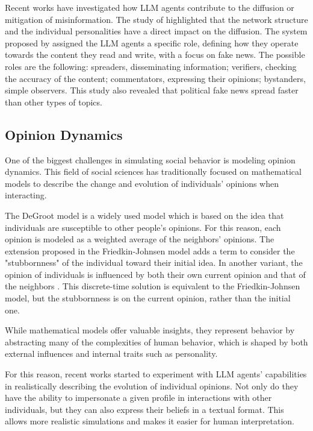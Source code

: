 Recent works have investigated how LLM agents contribute to the diffusion or mitigation of misinformation.
The study of \citet{hu2025simulatingrumorspreadingsocial} highlighted that the network structure and the individual personalities have a direct impact on the diffusion.
The system proposed by \citet{liu2024tinyslipgiantleap} assigned the LLM agents a specific role, defining how they operate towards the content they read and write, with a focus on fake news. The possible roles are the following: spreaders, disseminating information; verifiers, checking the accuracy of the content; commentators, expressing their opinions; bystanders, simple observers.
This study also revealed that political fake news spread faster than other types of topics.



\subsection{Opinion Dynamics}
One of the biggest challenges in simulating social behavior is modeling opinion dynamics. This field of social sciences has traditionally focused on mathematical models to describe the change and evolution of individuals' opinions when interacting.
\medskip

The DeGroot model \cite{Degroot1974} is a widely used model which is based on the idea that individuals are susceptible to other people's opinions. For this reason, each opinion is modeled as a weighted average of the neighbors' opinions.
The extension proposed in the Friedkin-Johnsen model \cite{friedkin_1990} adds a term to consider the "stubbornness" of the individual toward their initial idea. 
In another variant, the opinion of individuals is influenced by both their own current opinion and that of the neighbors \cite{Ye2018Opinion, Liu_2018}. This discrete-time solution is equivalent to the Friedkin-Johnsen model, but the stubbornness is on the current opinion, rather than the initial one.

\medskip
While mathematical models offer valuable insights, they represent behavior by abstracting many of the complexities of human behavior, which is shaped by both external influences and internal traits such as personality.

For this reason, recent works started to experiment with LLM agents' capabilities in realistically describing the evolution of individual opinions. 
Not only do they have the ability to impersonate a given profile in interactions with other individuals, but they can also express their beliefs in a textual format.
This allows more realistic simulations and makes it easier for human interpretation.

